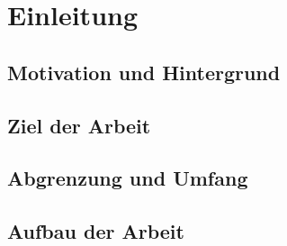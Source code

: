 \section{Einleitung}

\subsection{Motivation und Hintergrund}

\subsection{Ziel der Arbeit}

\subsection{Abgrenzung und Umfang}

\subsection{Aufbau der Arbeit}